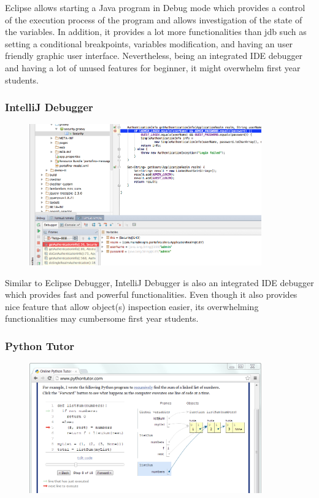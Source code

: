 \documentclass[11pt, a4paper]{article}
\begin{document}
Eclipse allows starting a Java program in Debug mode which provides a control of the execution process of the program and allows investigation of the state of the variables.
In addition, it provides a lot more functionalities than jdb such as setting a conditional breakpoints, variables modification, and having an user friendly graphic user interface.
Nevertheless, being an integrated IDE debugger and having a lot of unused features for beginner, it might overwhelm first year students.
\subsubsection{IntelliJ Debugger}
\begin{figure}[h!]
\centering
\includegraphics[width=100mm]{intellij.png}
\end{figure}

Similar to Eclipse Debugger, IntelliJ Debugger is also an integrated IDE debugger which provides fast and powerful functionalities.
Even though it also provides nice feature that allow object(s) inspection easier, its overwhelming functionalities may cumbersome first year students.
\subsubsection{Python Tutor}
\begin{figure}[h!]
\centering
\includegraphics[width=100mm]{pythontutor.png}
\end{figure}
\end{document}
